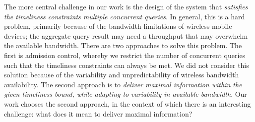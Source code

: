 The more central challenge in our work is the design of the system
that \emph{satisfies the timeliness constraints multiple concurrent
  queries}.
%
In general, this is a hard problem, primarily because of the
bandwidth limitations of wireless mobile devices;
the aggregate query result may need a throughput that may overwhelm
the available bandwidth.
%
There are two approaches to solve this problem.
%
The first is admission control, whereby we restrict the number of
concurrent queries such that the timeliness constraints can always be
met.
%
We did not consider this solution because of the variability and
unpredictability of wireless bandwidth availability.
%
The second approach is to \emph{deliver maximal information
within the given timeliness bound, while adapting to
variability in available bandwidth}.
%
Our work chooses the second approach, in the context of which there is
an interesting challenge: what does it mean to deliver maximal
information?






